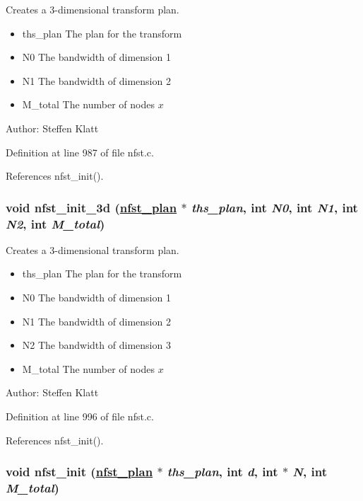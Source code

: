 Creates a 3-dimensional transform plan. 

\begin{itemize}
\item ths\_\-plan The plan for the transform \item N0 The bandwidth of dimension 1 \item N1 The bandwidth of dimension 2 \item M\_\-total The number of nodes $x$\end{itemize}
\begin{Desc}
\item[Author:]Steffen Klatt \end{Desc}


Definition at line 987 of file nfst.c.

References nfst\_\-init().\hypertarget{group__nfsct_ga17}{
\subsubsection[nfst\_\-init\_\-3d]{\setlength{\rightskip}{0pt plus 5cm}void nfst\_\-init\_\-3d (\hyperlink{structnfst__plan}{nfst\_\-plan} $\ast$ {\em ths\_\-plan}, int {\em N0}, int {\em N1}, int {\em N2}, int {\em M\_\-total})}}
\label{group__nfsct_ga17}


Creates a 3-dimensional transform plan. 

\begin{itemize}
\item ths\_\-plan The plan for the transform \item N0 The bandwidth of dimension 1 \item N1 The bandwidth of dimension 2 \item N2 The bandwidth of dimension 3 \item M\_\-total The number of nodes $x$\end{itemize}
\begin{Desc}
\item[Author:]Steffen Klatt \end{Desc}


Definition at line 996 of file nfst.c.

References nfst\_\-init().\hypertarget{group__nfsct_ga18}{
\subsubsection[nfst\_\-init]{\setlength{\rightskip}{0pt plus 5cm}void nfst\_\-init (\hyperlink{structnfst__plan}{nfst\_\-plan} $\ast$ {\em ths\_\-plan}, int {\em d}, int $\ast$ {\em N}, int {\em M\_\-total})}}
\label{group__nfsct_ga18}


